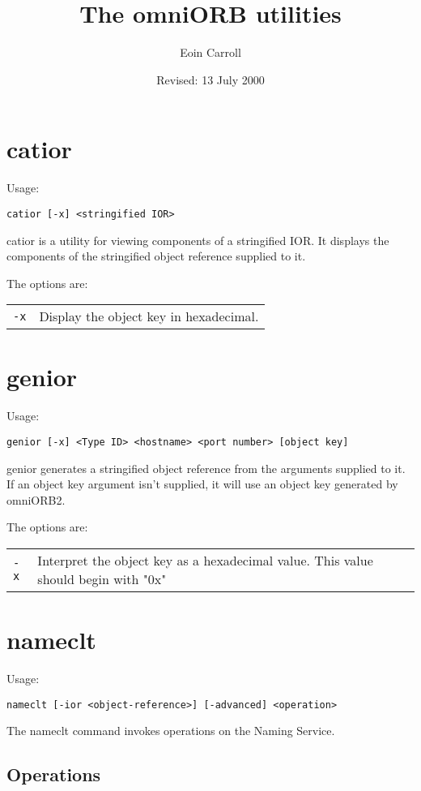 \documentclass[11pt,a4paper,twoside]{article}
\title{The omniORB utilities}
\author{Eoin Carroll}
\date{Revised: 13 July 2000}
\begin{document}
\maketitle

\section{catior}
Usage:
\begin{verbatim}
catior [-x] <stringified IOR>
\end{verbatim}

\noindent catior is a utility for viewing components of a stringified
IOR.  It displays the components of the stringified object reference
supplied to it.

The options are:


\begin{tabular}{ll}
\verb.-x.
  & Display the object key in hexadecimal.
\end{tabular}


\section{genior}
Usage: 
\begin{verbatim}
genior [-x] <Type ID> <hostname> <port number> [object key]
\end{verbatim}

\noindent genior generates a stringified object reference from the
arguments supplied to it.  If an object key argument isn't supplied,
it will use an object key generated by omniORB2.

The options are:


\begin{tabular}{lp{}}
\verb.-x.
 & Interpret the object key as a hexadecimal value. This 
value should begin with "0x"
\end{tabular}


\section{nameclt}
Usage: 
\begin{verbatim}
nameclt [-ior <object-reference>] [-advanced] <operation> 
\end{verbatim}

\noindent The nameclt command invokes operations on the Naming
Service.

\subsection{Operations}
\end{document}

